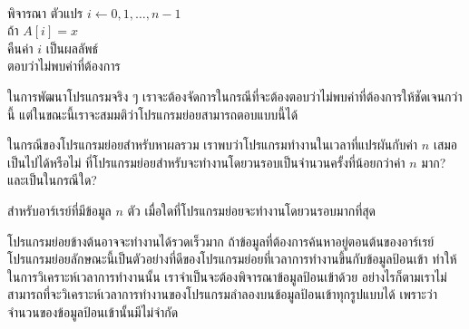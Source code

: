 \begin{algt}
\\
\hspace*{0.2in} พิจารณา ตัวแปร $i\leftarrow 0,1,\ldots, n-1$\\
\hspace*{0.2in}\hspace*{0.2in} ถ้า $A[i] = x$\\
\hspace*{0.2in}\hspace*{0.2in}\hspace*{0.2in} คืน{\wbr}ค่า $i$ เป็น{\wbr}ผลลัพธ์\\
\hspace*{0.2in} ตอบ{\wbr}ว่า{\wbr}ไม่{\wbr}พบ{\wbr}ค่า{\wbr}ที่{\wbr}ต้องการ{\wbr}
\end{algt}

ใน{\wbr}การ{\wbr}พัฒนา{\wbr}โปรแกรม{\wbr}จริง ๆ
เรา{\wbr}จะ{\wbr}ต้อง{\wbr}จัดการ{\wbr}ใน{\wbr}กรณี{\wbr}ที่{\wbr}จะ{\wbr}ต้อง{\wbr}ตอบ{\wbr}ว่า{\wbr}ไม่{\wbr}พบ{\wbr}ค่า{\wbr}ที่{\wbr}ต้องการ{\wbr}ให้{\wbr}ชัดเจน{\wbr}กว่า{\wbr}นี้{\wbr}
แต่{\wbr}ใน{\wbr}ขณะนี้{\wbr}เรา{\wbr}จะ{\wbr}สมมติ{\wbr}ว่า{\wbr}โปรแกรมย่อย{\wbr}สามารถ{\wbr}ตอบ{\wbr}แบบ{\wbr}นี้{\wbr}ได้{\wbr}

\begin{quiz}{}
ใน{\wbr}กรณี{\wbr}ของ{\wbr}โปรแกรมย่อย{\wbr}สำหรับ{\wbr}หา{\wbr}ผลรวม เรา{\wbr}พบ{\wbr}ว่า{\wbr}โปรแกรม{\wbr}ทำงาน{\wbr}ใน{\wbr}เวลา{\wbr}ที่{\wbr}แปรผัน{\wbr}กับ{\wbr}ค่า $n$
เสมอ เป็น{\wbr}ไป{\wbr}ได้{\wbr}หรือ{\wbr}ไม่ ที่{\wbr}โปรแกรมย่อย{\wbr}สำหรับ{\wbr}จะ{\wbr}ทำงาน{\wbr}โดย{\wbr}วน{\wbr}รอบ{\wbr}เป็น{\wbr}จำนวน{\wbr}ครั้ง{\wbr}ที่{\wbr}น้อย{\wbr}กว่า{\wbr}ค่า $n$ มาก? และ{\wbr}เป็น{\wbr}ใน{\wbr}กรณี{\wbr}ใด?
\end{quiz}

\begin{quiz}{}
สำหรับ{\wbr}อาร์เรย์{\wbr}ที่{\wbr}มี{\wbr}ข้อมูล $n$ ตัว เมื่อใด{\wbr}ที่{\wbr}โปรแกรมย่อย{\wbr}จะ{\wbr}ทำงาน{\wbr}โดย{\wbr}วน{\wbr}รอบ{\wbr}มาก{\wbr}ที่สุด{\wbr}
\end{quiz}

โปรแกรมย่อย{\wbr}ข้างต้น{\wbr}อาจ{\wbr}จะ{\wbr}ทำงาน{\wbr}ได้{\wbr}รวดเร็ว{\wbr}มาก ถ้า{\wbr}ข้อมูล{\wbr}ที่{\wbr}ต้องการ{\wbr}ค้นหา{\wbr}อยู่{\wbr}ตอน{\wbr}ต้น{\wbr}ของ{\wbr}อาร์เรย์
โปรแกรมย่อย{\wbr}ลักษณะ{\wbr}นี้{\wbr}เป็น{\wbr}ตัวอย่าง{\wbr}ที่{\wbr}ดี{\wbr}ของ{\wbr}โปรแกรมย่อย{\wbr}ที่{\wbr}เวลา{\wbr}การ{\wbr}ทำงาน{\wbr}ขึ้น{\wbr}กับ{\wbr}ข้อมูล{\wbr}ป้อน{\wbr}เข้า{\wbr}
ทำ{\wbr}ให้{\wbr}ใน{\wbr}การ{\wbr}วิเคราะห์{\wbr}เวลา{\wbr}การ{\wbr}ทำงาน{\wbr}นั้น เรา{\wbr}จำเป็น{\wbr}จะ{\wbr}ต้อง{\wbr}พิจารณา{\wbr}ข้อมูล{\wbr}ป้อน{\wbr}เข้า{\wbr}ด้วย{\wbr}
อย่างไรก็ตาม{\wbr}เรา{\wbr}ไม่{\wbr}สามารถ{\wbr}ที่{\wbr}จะ{\wbr}วิเคราะห์{\wbr}เวลา{\wbr}การ{\wbr}ทำงาน{\wbr}ของ{\wbr}โปรแกรม{\wbr}ลำ{\wbr}ลอง{\wbr}บน{\wbr}ข้อมูล{\wbr}ป้อน{\wbr}เข้า{\wbr}ทุก{\wbr}รูปแบบ{\wbr}ได้{\wbr}
เพราะว่า{\wbr}จำนวน{\wbr}ของ{\wbr}ข้อมูล{\wbr}ป้อน{\wbr}เข้า{\wbr}นั้น{\wbr}มี{\wbr}ไม่{\wbr}จำกัด{\wbr}

